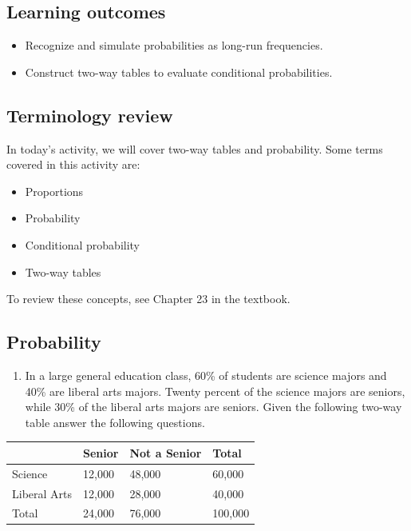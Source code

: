 \documentclass[
]{report}
\providecommand{\tightlist}{%
  \setlength{\itemsep}{0pt}\setlength{\parskip}{0pt}}
\begin{document}

\hypertarget{learning-outcomes-28}{%
\subsection{Learning outcomes}\label{learning-outcomes-28}}

\begin{itemize}
\item
  Recognize and simulate probabilities as long-run frequencies.
\item
  Construct two-way tables to evaluate conditional probabilities.
\end{itemize}

\hypertarget{terminology-review-23}{%
\subsection{Terminology review}\label{terminology-review-23}}

In today's activity, we will cover two-way tables and probability. Some terms covered in this activity are:

\begin{itemize}
\item
  Proportions
\item
  Probability
\item
  Conditional probability
\item
  Two-way tables
\end{itemize}

To review these concepts, see Chapter 23 in the textbook.

\hypertarget{probability}{%
\subsection{Probability}\label{probability}}

\begin{enumerate}
\def\labelenumi{\arabic{enumi}.}
\tightlist
\item
  In a large general education class, 60\% of students are science majors and 40\% are liberal arts majors. Twenty percent of the science majors are seniors, while 30\% of the liberal arts majors are seniors. Given the following two-way table answer the following questions.
\end{enumerate}

\begin{longtable}[]{@{}llll@{}}
\toprule()
& Senior & Not a Senior & Total \\
\midrule()
\endhead
Science & 12,000 & 48,000 & 60,000 \\
Liberal Arts & 12,000 & 28,000 & 40,000 \\
Total & 24,000 & 76,000 & 100,000 \\
\bottomrule()
\end{longtable}
\end{document}
